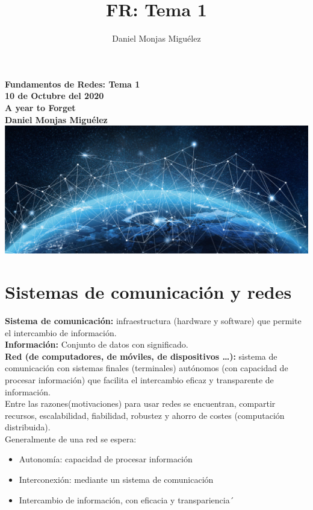 \documentclass[a4paper,11pt]{article}
\author{Daniel Monjas Miguélez}
\title{FR: Tema 1}
\begin{document}
\begin{titlepage}
\centering
    \vfill
    {\bfseries\Large
        Fundamentos de Redes: Tema 1\\
        10 de Octubre del 2020\\
        A year to Forget \\
        \vskip2cm
        Daniel Monjas Miguélez\\
    }    
    \vfill
    \includegraphics[width=15cm]{redes.jpg}
    \vfill
    \vfill
\end{titlepage}

\newpage
\tableofcontents
\newpage

\section{Sistemas de comunicación y redes}
\textbf{Sistema de comunicación:} infraestructura (hardware y software) que permite el intercambio de información. \\

\textbf{Información:} Conjunto de datos con significado. \\

\textbf{Red (de computadores, de móviles, de dispositivos \ldots):} sistema de comunicación con sistemas finales (terminales) autónomos (con capacidad de procesar información) que facilita el intercambio eficaz y transparente de información. \\

Entre las razones(motivaciones) para usar redes se encuentran, compartir recursos, escalabilidad, fiabilidad, robustez y ahorro de costes (computación distribuida). \\

Generalmente de una red se espera:

\begin{itemize}
\item Autonomía: capacidad de procesar información
\item Interconexión: mediante un sistema de comunicación
\item Intercambio de información, con eficacia y transpariencia´
\end{itemize}
\end{document}
